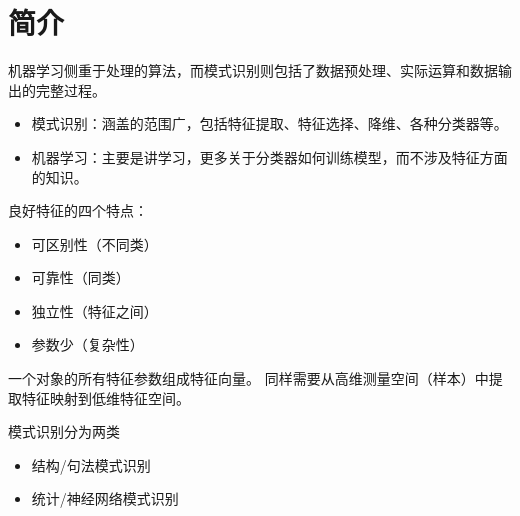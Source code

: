 
\section{简介}
机器学习侧重于处理的算法，而模式识别则包括了数据预处理、实际运算和数据输出的完整过程。
\begin{itemize}
\item 模式识别：涵盖的范围广，包括特征提取、特征选择、降维、各种分类器等。
\item 机器学习：主要是讲学习，更多关于分类器如何训练模型，而不涉及特征方面的知识。
\end{itemize}

良好特征的四个特点：
\begin{itemize}
	\item 可区别性（不同类）
	\item 可靠性（同类）
	\item 独立性（特征之间）
	\item 参数少（复杂性）
\end{itemize}

一个对象的所有特征参数组成特征向量。
同样需要从高维测量空间（样本）中提取特征映射到低维特征空间。

模式识别分为两类
\begin{itemize}
	\item 结构/句法模式识别
	\item 统计/神经网络模式识别
\end{itemize}